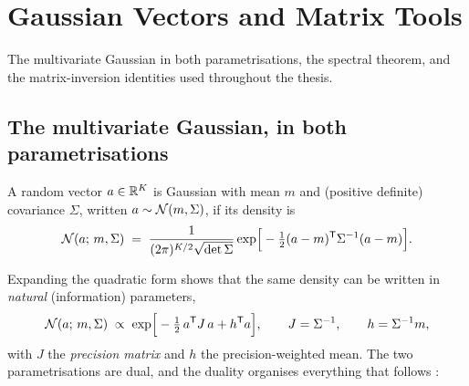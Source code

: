 \chapter{Gaussian Vectors and Matrix Tools}
\label{app:linalg}

The multivariate Gaussian in both parametrisations, the spectral theorem,
and the matrix-inversion identities used throughout the thesis.

\section{The multivariate Gaussian, in both parametrisations}
\label{sec:gauss-vectors}

\begin{definition}\label{def:gaussian}
A random vector $a \in \mathbb{R}^K$ is Gaussian with mean $m$ and (positive
definite) covariance $\Sigma$, written $a \sim \mathcal{N}(m, \Sigma)$, if its
density is
\begin{equation}
  \mathcal{N}(a;\, m, \Sigma)
  \;=\; \frac{1}{(2\pi)^{K/2} \sqrt{\det \Sigma}}
  \exp\!\Big[ -\tfrac{1}{2} (a - m)^{\mathsf{T}} \Sigma^{-1} (a - m) \Big] .
  \label{eq:gauss-density}
\end{equation}
\end{definition}

Expanding the quadratic form shows that the same density can be written
in \emph{natural} (information) parameters,
\begin{equation}
  \mathcal{N}(a;\, m, \Sigma) \;\propto\;
  \exp\!\Big[ -\tfrac{1}{2}\, a^{\mathsf{T}} J\, a + h^{\mathsf{T}} a \Big],
  \qquad
  J = \Sigma^{-1},
  \qquad
  h = \Sigma^{-1} m ,
  \label{eq:gauss-natural}
\end{equation}
with $J$ the \emph{precision matrix} and $h$ the precision-weighted mean.
The two parametrisations are dual, and the duality organises everything
that follows \citep{bishop2006pattern, koller2009probabilistic}:

